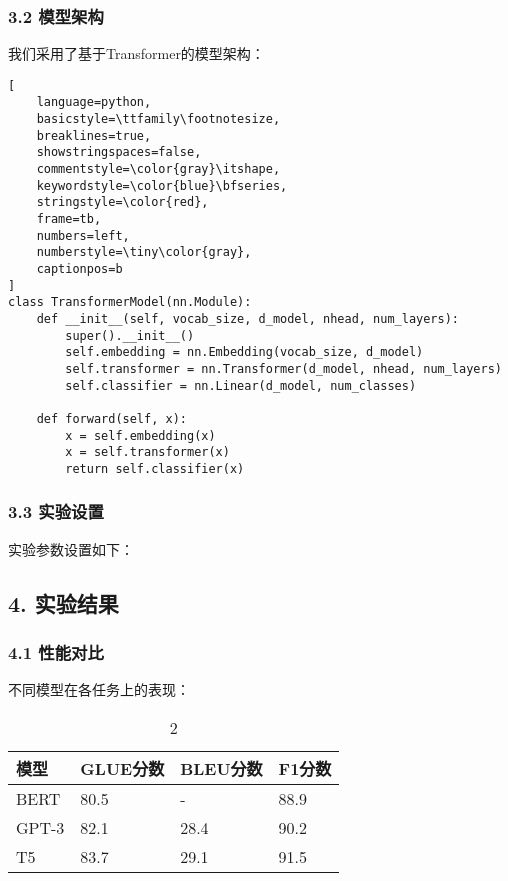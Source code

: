 \documentclass[UTF8, a4paper, 11pt]{ctexart}
\begin{document}
\subsubsection{3.2 模型架构}


我们采用了基于Transformer的模型架构：


\begin{lstlisting}[
    language=python,
    basicstyle=\ttfamily\footnotesize,
    breaklines=true,
    showstringspaces=false,
    commentstyle=\color{gray}\itshape,
    keywordstyle=\color{blue}\bfseries,
    stringstyle=\color{red},
    frame=tb,
    numbers=left,
    numberstyle=\tiny\color{gray},
    captionpos=b
]
class TransformerModel(nn.Module):
    def __init__(self, vocab_size, d_model, nhead, num_layers):
        super().__init__()
        self.embedding = nn.Embedding(vocab_size, d_model)
        self.transformer = nn.Transformer(d_model, nhead, num_layers)
        self.classifier = nn.Linear(d_model, num_classes)
    
    def forward(self, x):
        x = self.embedding(x)
        x = self.transformer(x)
        return self.classifier(x)

\end{lstlisting}


\subsubsection{3.3 实验设置}


实验参数设置如下：

\subsection{4. 实验结果}


\subsubsection{4.1 性能对比}


不同模型在各任务上的表现：


\begin{table}[htbp]
    \centering
    \caption{2}
    \label{tab:table2}
    \begin{tabular}{|l|l|l|l|}
        \toprule
        \textbf{模型} & \textbf{GLUE分数} & \textbf{BLEU分数} & \textbf{F1分数} \\
        \midrule
        BERT & 80.5 & - & 88.9 \\
        GPT-3 & 82.1 & 28.4 & 90.2 \\
        T5 & 83.7 & 29.1 & 91.5 \\
        \bottomrule
    \end{tabular}
\end{table}
\end{document}
